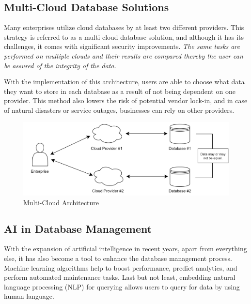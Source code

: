\documentclass[12pt, a4paper]{article}
\begin{document}
    \subsection{Multi-Cloud Database Solutions}
        Many enterprises utilize cloud databases by at least two different providers. This strategy is referred to as a multi-cloud database solution, and although it has its challenges, it comes with significant security improvements. \textit{The same tasks are performed on multiple clouds and their results are compared thereby the user can be assured of the integrity of the data.}\cite{17}\par With the implementation of this architecture, users are able to choose what data they want to store in each database as a result of not being dependent on one provider. This method also lowers the risk of potential vendor lock-in, and in case of natural disasters or service outages, businesses can rely on other providers.
        \begin{figure}[ht]
            \centering
            \includegraphics[width=1\linewidth]{images/multicloud.png}
            \caption{Multi-Cloud Architecture\cite{103}}
            \label{fig:multicloud}
        \end{figure}
        
    \subsection{AI in Database Management}
        With the expansion of artificial intelligence in recent years, apart from everything else, it has also become a tool to enhance the database management process. Machine learning algorithms help to boost performance, predict analytics, and perform automated maintenance tasks. Last but not least, embedding natural language processing (NLP) for querying allows users to query for data by using human language.
\clearpage
\end{document}
